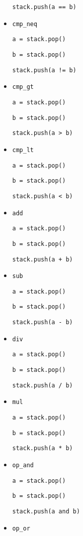 \begin{itemize}
  \texttt{stack.push(a == b)}

\item \texttt{cmp\_neq}

  \texttt{a = stack.pop()}

  \texttt{b = stack.pop()}

  \texttt{stack.push(a != b)}

\item \texttt{cmp\_gt}

  \texttt{a = stack.pop()}

  \texttt{b = stack.pop()}

  \texttt{stack.push(a > b)}

\item \texttt{cmp\_lt}

  \texttt{a = stack.pop()}

  \texttt{b = stack.pop()}

  \texttt{stack.push(a < b)}

\item \texttt{add}

  \texttt{a = stack.pop()}

  \texttt{b = stack.pop()}

  \texttt{stack.push(a + b)}

\item \texttt{sub}

  \texttt{a = stack.pop()}

  \texttt{b = stack.pop()}

  \texttt{stack.push(a - b)}

\item \texttt{div}
  
  \texttt{a = stack.pop()}

  \texttt{b = stack.pop()}

  \texttt{stack.push(a / b)}

\item \texttt{mul}

  \texttt{a = stack.pop()}

  \texttt{b = stack.pop()}

  \texttt{stack.push(a * b)}

\item \texttt{op\_and}

  \texttt{a = stack.pop()}

  \texttt{b = stack.pop()}

  \texttt{stack.push(a and b)}

\item \texttt{op\_or}


\end{itemize}
